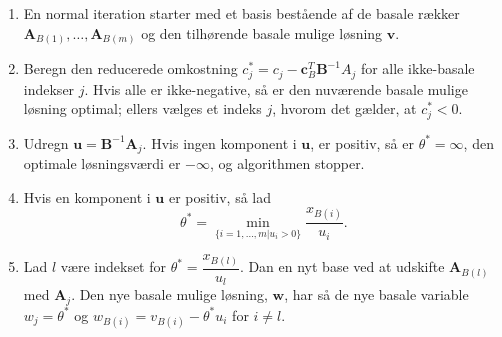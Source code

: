 \begin{tcolorbox}[
title=Den naive implementering,
colback		= myblue!15,
colframe	= myblue!15,
coltitle	= black,
before skip	= 20pt plus 2pt,
after skip	= 20pt plus 2pt,
fonttitle	= \bfseries]
\begin{enumerate}
\item En normal iteration starter med et basis bestående af de basale rækker $\textbf{A}_{B(1)},\ldots,\textbf{A}_{B(m)}$ og den tilhørende basale mulige løsning $\textbf{v}$.
\item Beregn den reducerede omkostning $c_j^* = c_j - \mathbf{c}_B^T \textbf{B}^{-1}A_j$ for alle ikke-basale indekser $j$.
Hvis alle er ikke-negative, så er den nuværende basale mulige løsning optimal; ellers vælges et indeks $j$, hvorom det gælder, at $c^*_j<0.$
\item Udregn $\textbf{u}=\textbf{B}^{-1}\textbf{A}_j$.
Hvis ingen komponent i $\textbf{u}$, er positiv, så er $\theta ^*=\infty$, den optimale løsningsværdi er $-\infty$, og algorithmen stopper.
\item Hvis en komponent i $\textbf{u}$ er positiv, så lad 
$$\theta^*= \min_{ \{i=1,\ldots,m|u_i>0 \} }        \dfrac{x_{B(i)}}{u_i}.$$
\item Lad $l$ være indekset for $\theta^*=  \dfrac{x_{B(l)}}{u_l}$.
Dan en nyt base ved at udskifte $\textbf{A}_{B(l)}$ med $\textbf{A}_j$.
Den nye basale mulige løsning, $\textbf{w}$, har så de nye basale variable $w_j=\theta^*$ og $w_{B(i)}=v_{B(i)}-\theta^*u_i$ for $i\neq l.$
\end{enumerate}
\end{tcolorbox}
%
